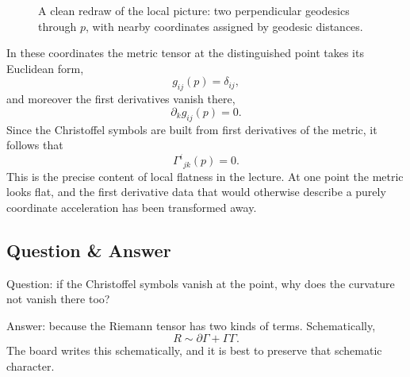 \begin{figure}[t]
\centering
{}
\caption{A clean redraw of the local picture: two perpendicular geodesics through \(p\), with nearby coordinates assigned by geodesic distances.}
\end{figure}

In these coordinates the metric tensor at the distinguished point takes its Euclidean form,
\begin{equation}
g_{ij}(p)=\delta_{ij},
\end{equation}
and moreover the first derivatives vanish there,
\begin{equation}
\partial_k g_{ij}(p)=0.
\end{equation}
Since the Christoffel symbols are built from first derivatives of the metric, it follows that
\begin{equation}
\Gamma^{i}{}_{jk}(p)=0.
\end{equation}
This is the precise content of local flatness in the lecture. At one point the metric looks flat, and the first derivative data that would otherwise describe a purely coordinate acceleration has been transformed away.

\subsection{Question \& Answer}

Question: if the Christoffel symbols vanish at the point, why does the curvature not vanish there too?

Answer: because the Riemann tensor has two kinds of terms. Schematically,
\begin{equation}
R \sim \partial \Gamma + \Gamma\Gamma.
\end{equation}
The board writes this schematically, and it is best to preserve that schematic character.

